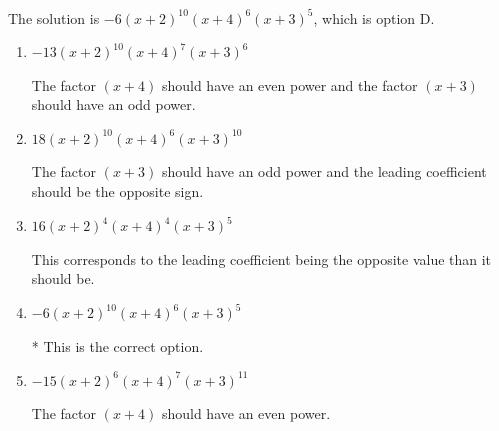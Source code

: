 \documentclass{extbook}[14pt]
\begin{document}
\begin{enumerate}
{The solution is \( -6(x + 2)^{10} (x + 4)^{6} (x + 3)^{5} \), which is option D.\begin{enumerate}[label=\Alph*.]
\item \( -13(x + 2)^{10} (x + 4)^{7} (x + 3)^{6} \)

The factor $(x + 4)$ should have an even power and the factor $(x + 3)$ should have an odd power.
\item \( 18(x + 2)^{10} (x + 4)^{6} (x + 3)^{10} \)

The factor $(x + 3)$ should have an odd power and the leading coefficient should be the opposite sign.
\item \( 16(x + 2)^{4} (x + 4)^{4} (x + 3)^{5} \)

This corresponds to the leading coefficient being the opposite value than it should be.
\item \( -6(x + 2)^{10} (x + 4)^{6} (x + 3)^{5} \)

* This is the correct option.
\item \( -15(x + 2)^{6} (x + 4)^{7} (x + 3)^{11} \)

The factor $(x + 4)$ should have an even power.
\end{enumerate}

}
\end{enumerate}
\end{document}
